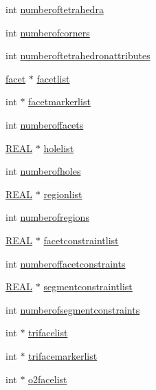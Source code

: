 \begin{DoxyCompactItemize}
\item 
int \hyperlink{classtetgenio_ad9a3fc307214cd459ca367c55d4bc16d}{numberoftetrahedra}
\item 
int \hyperlink{classtetgenio_a7d31410cbdcf2c1557ae7c1148c2eed7}{numberofcorners}
\item 
int \hyperlink{classtetgenio_ac22e481bf9a3662b173599914a696f7a}{numberoftetrahedronattributes}
\item 
\hyperlink{structtetgenio_1_1facet}{facet} $\ast$ \hyperlink{classtetgenio_ad65489b9aece6ba14ff8e3c89f533ced}{facetlist}
\item 
int $\ast$ \hyperlink{classtetgenio_a0d5d9d0718980f8e9d4ecc3e771abba0}{facetmarkerlist}
\item 
int \hyperlink{classtetgenio_af1cb1515751c9cd0497abba62da8790d}{numberoffacets}
\item 
\hyperlink{tetgen_8h_a4b654506f18b8bfd61ad2a29a7e38c25}{R\-E\-A\-L} $\ast$ \hyperlink{classtetgenio_a395bd7fc3f66dd013efd5176a0d54265}{holelist}
\item 
int \hyperlink{classtetgenio_ad12a46036cd44a7a646228d5471b51ac}{numberofholes}
\item 
\hyperlink{tetgen_8h_a4b654506f18b8bfd61ad2a29a7e38c25}{R\-E\-A\-L} $\ast$ \hyperlink{classtetgenio_a74b5593324c79ad60d9bb0951afb2b41}{regionlist}
\item 
int \hyperlink{classtetgenio_a0394c99b57c4412515183ada3c1d8951}{numberofregions}
\item 
\hyperlink{tetgen_8h_a4b654506f18b8bfd61ad2a29a7e38c25}{R\-E\-A\-L} $\ast$ \hyperlink{classtetgenio_aabfef9df7956218bcb98ee39f1a9814b}{facetconstraintlist}
\item 
int \hyperlink{classtetgenio_acd7176cc55338187a391016acfb53913}{numberoffacetconstraints}
\item 
\hyperlink{tetgen_8h_a4b654506f18b8bfd61ad2a29a7e38c25}{R\-E\-A\-L} $\ast$ \hyperlink{classtetgenio_ab63298ebb6904d1dfa8ddebb13440ef7}{segmentconstraintlist}
\item 
int \hyperlink{classtetgenio_a56142dec4914ffaaf5093c4aaa23b7d4}{numberofsegmentconstraints}
\item 
int $\ast$ \hyperlink{classtetgenio_a25e290684bfb26d4d9b5e67059c572e2}{trifacelist}
\item 
int $\ast$ \hyperlink{classtetgenio_a22a2e0937d0da63a2fda26fc1671b32f}{trifacemarkerlist}
\item 
int $\ast$ \hyperlink{classtetgenio_aad1e2f66ad5c438fb2bee5d510fdca19}{o2facelist}
\item 

\end{DoxyCompactItemize}
